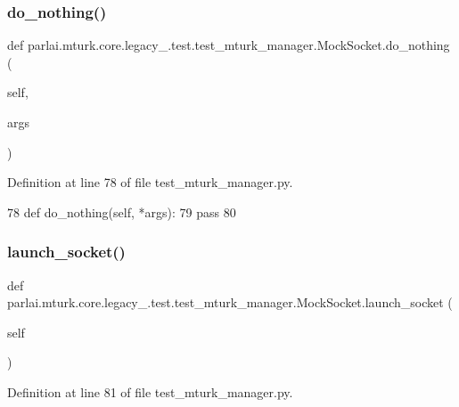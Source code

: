 \subsubsection{\texorpdfstring{do\+\_\+nothing()}{do\_nothing()}}
{\footnotesize\ttfamily def parlai.\+mturk.\+core.\+legacy\+\_.\+test.\+test\+\_\+mturk\+\_\+manager.\+Mock\+Socket.\+do\+\_\+nothing (\begin{DoxyParamCaption}\item[{}]{self,  }\item[{}]{args }\end{DoxyParamCaption})}



Definition at line 78 of file test\+\_\+mturk\+\_\+manager.\+py.


\begin{DoxyCode}
78     \textcolor{keyword}{def }do\_nothing(self, *args):
79         \textcolor{keywordflow}{pass}
80 
\end{DoxyCode}
\mbox{\label{classparlai_1_1mturk_1_1core_1_1legacy__2018_1_1test_1_1test__mturk__manager_1_1MockSocket_a610fa5da10a66df185843eac56e16c1a}} 
\subsubsection{\texorpdfstring{launch\+\_\+socket()}{launch\_socket()}}
{\footnotesize\ttfamily def parlai.\+mturk.\+core.\+legacy\+\_.\+test.\+test\+\_\+mturk\+\_\+manager.\+Mock\+Socket.\+launch\+\_\+socket (\begin{DoxyParamCaption}\item[{}]{self }\end{DoxyParamCaption})}



Definition at line 81 of file test\+\_\+mturk\+\_\+manager.\+py.


